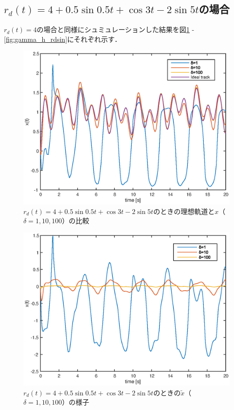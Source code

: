 \documentclass[a4paper,12pt]{jarticle}
\begin{document}
\subsection{$r_d(t)=4+0.5\sin 0.5t + \cos 3t - 2\sin 5t$の場合}
$r_d(t)=4$の場合と同様にシュミュレーションした結果を図\ref{fig:x_rdsin}
- \ref{fig:gamma_h_rdsin}にそれぞれ示す．
%
\begin{figure}[htb]
    \begin{center}
       \includegraphics[width=140mm]{fig/x_rdsin.eps}
        \caption{$r_d(t)=4+0.5\sin 0.5t + \cos 3t - 2\sin 5t$のときの理想軌道と$x$（$\delta=1,10,100$）の比較}
        \label{fig:x_rdsin}
    \end{center}
\end{figure}
%
%
\begin{figure}[htb]
    \begin{center}
       \includegraphics[width=140mm]{fig/x_tilde_rdsin.eps}
        \caption{$r_d(t)=4+0.5\sin 0.5t + \cos 3t - 2\sin 5t$のときの$\tilde{x}$（$\delta=1,10,100$）の様子}
        \label{fig:x_tilde_rdsin}
    \end{center}
\end{figure}
\end{document}
